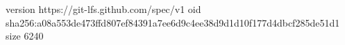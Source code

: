 version https://git-lfs.github.com/spec/v1
oid sha256:a08a553de473ffd807ef84391a7ee6d9c4ee38d9d1d10f177d4dbcf285de51d1
size 6240
